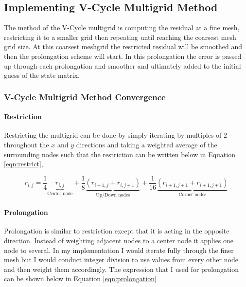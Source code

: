 \pagebreak
\subsection{Implementing V-Cycle Multigrid Method}



The method of the V-Cycle multigrid is computing the residual at a fine mesh, restricting it to a smaller grid then repeating until reaching the coarsest mesh grid size. At this coarsest meshgrid the restricted residual will be smoothed and then the prolongation scheme will start. In this prolongation the error is passed up through each prolongation and smoother and ultimately added to the initial guess of the state matrix.

    \subsubsection{V-Cycle Multigrid Method Convergence}
    \paragraph{Restriction}
    Restricting the multigrid can be done by simply iterating by multiples of 2 throughout the $x$ and $y$ directions and taking a weighted average of the surrounding nodes such that the restriction can be written below in Equation \ref{eqn:restrict},

        \begin{equation}
            r_{i,j} = \frac{1}{4}\underbrace{r_{i,j}}_{\text{Center node}} + \frac{1}{8}\underbrace{\left(r_{i\pm 1,j} + r_{i,j\pm 1}\right)}_{\text{Up/Down nodes}} + \frac{1}{16}\underbrace{\left(r_{i\pm 1,j\pm 1} + r_{i\pm 1,j\mp 1} \right)}_{\text{Corner nodes}}
            \label{eqn:restrict}
        \end{equation}

    \paragraph{Prolongation}
    Prolongation is similar to restriction except that it is acting in the opposite direction. Instead of weighting adjacent nodes to a center node it applies one node to several. In my implementation I would iterate fully through the finer mesh but I would conduct integer division to use values from every other node and then weight them accordingly. The expression that I used for prolongation can be shown below in Equation \ref{eqn:prolongation}

